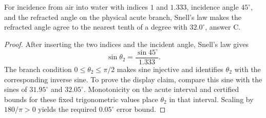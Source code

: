 \begin{theorem}
\label{thm:physics:phyx_mini_0001:target}
For incidence from air into water with indices \(1\) and \(1.333\), incidence
angle \(45^\circ\), and the refracted angle on the physical acute branch,
Snell's law makes the refracted angle agree to the nearest tenth of a degree
with \(32.0^\circ\), answer C.
\end{theorem}
\begin{proof}
After inserting the two indices and the incident angle, Snell's law gives
\[
 \sin\theta_2=\frac{\sin45^\circ}{1.333}.
\]
The branch condition \(0\leq\theta_2\leq\pi/2\) makes sine injective and
identifies \(\theta_2\) with the corresponding inverse sine.  To prove the
display claim, compare this sine with the sines of \(31.95^\circ\) and
\(32.05^\circ\).  Monotonicity on the acute interval and certified bounds for
these fixed trigonometric values place \(\theta_2\) in that interval.  Scaling
by \(180/\pi>0\) yields the required \(0.05^\circ\) error bound.
\end{proof}


